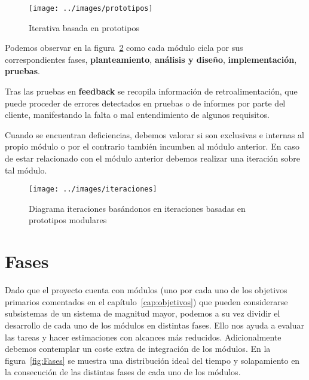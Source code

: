 \begin{figure}[h]
	\centering
	\texttt{[image: ../images/prototipos]}
	\caption[Iterativa basada en prototipos modulares]{Iterativa basada en prototipos}
	\label{fig:iterProto}
\end{figure}



Podemos observar en la figura~\ref{fig:iterativa_basada_prototipos_modular} como cada módulo cicla por sus correspondientes fases, \textbf{planteamiento}, \textbf{análisis y diseño}, \textbf{implementación}, \textbf{pruebas}.

Tras las pruebas en \textbf{feedback} se recopila información de retroalimentación, que puede proceder de errores detectados en pruebas o de  informes por parte del cliente, manifestando la falta o mal entendimiento de algunos requisitos. 

Cuando se encuentran deficiencias, debemos valorar si son exclusivas e internas al propio módulo o por el contrario también incumben al módulo anterior. En caso de estar relacionado con el módulo anterior debemos realizar una iteración sobre tal módulo.

\begin{figure}
	\centering
	\texttt{[image: ../images/iteraciones]}
	\caption[Iterativa basada en prototipos modulares]{Diagrama iteraciones basándonos en iteraciones basadas en prototipos modulares}
	\label{fig:iterativa_basada_prototipos_modular}
\end{figure}




	
\section{Fases}

Dado que el proyecto cuenta con módulos (uno por cada uno de los objetivos primarios comentados en el capítulo~\ref{cap:objetivos}) que pueden considerarse subsistemas de un sistema de magnitud mayor, 
podemos a su vez dividir el desarrollo de cada uno de los módulos en distintas fases. Ello nos ayuda a evaluar las tareas y hacer estimaciones con alcances más reducidos. Adicionalmente debemos contemplar un coste extra de integración de los módulos. En la figura~\ref{fig:Fases} se muestra una distribución ideal del tiempo y solapamiento en la consecución de las distintas fases de cada uno de los módulos.

